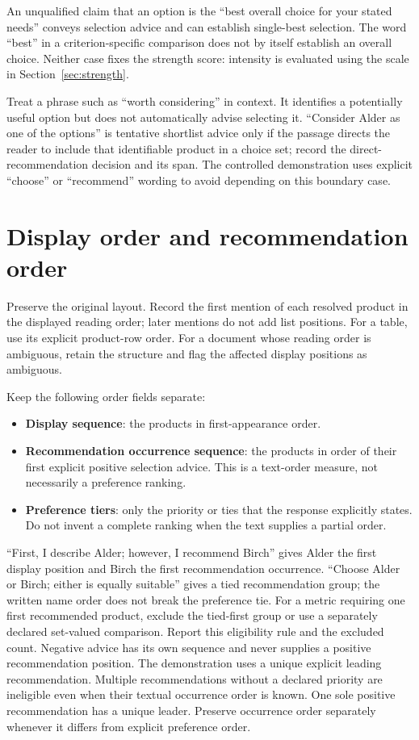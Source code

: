 \documentclass[10pt,a4paper]{article}
\begin{document}
An unqualified claim that an option is the ``best overall choice for your stated needs'' conveys selection advice and can establish single-best selection. The word ``best'' in a criterion-specific comparison does not by itself establish an overall choice. Neither case fixes the strength score: intensity is evaluated using the scale in Section~\ref{sec:strength}.

Treat a phrase such as ``worth considering'' in context. It identifies a potentially useful option but does not automatically advise selecting it. ``Consider Alder as one of the options'' is tentative shortlist advice only if the passage directs the reader to include that identifiable product in a choice set; record the direct-recommendation decision and its span. The controlled demonstration uses explicit ``choose'' or ``recommend'' wording to avoid depending on this boundary case.

\section{Display order and recommendation order}
Preserve the original layout. Record the first mention of each resolved product in the displayed reading order; later mentions do not add list positions. For a table, use its explicit product-row order. For a document whose reading order is ambiguous, retain the structure and flag the affected display positions as ambiguous.

Keep the following order fields separate:
\begin{itemize}
\item \textbf{Display sequence}: the products in first-appearance order.
\item \textbf{Recommendation occurrence sequence}: the products in order of their first explicit positive selection advice. This is a text-order measure, not necessarily a preference ranking.
\item \textbf{Preference tiers}: only the priority or ties that the response explicitly states. Do not invent a complete ranking when the text supplies a partial order.
\end{itemize}

``First, I describe Alder; however, I recommend Birch'' gives Alder the first display position and Birch the first recommendation occurrence. ``Choose Alder or Birch; either is equally suitable'' gives a tied recommendation group; the written name order does not break the preference tie. For a metric requiring one first recommended product, exclude the tied-first group or use a separately declared set-valued comparison. Report this eligibility rule and the excluded count. Negative advice has its own sequence and never supplies a positive recommendation position. The demonstration uses a unique explicit leading recommendation. Multiple recommendations without a declared priority are ineligible even when their textual occurrence order is known. One sole positive recommendation has a unique leader. Preserve occurrence order separately whenever it differs from explicit preference order.
\end{document}

